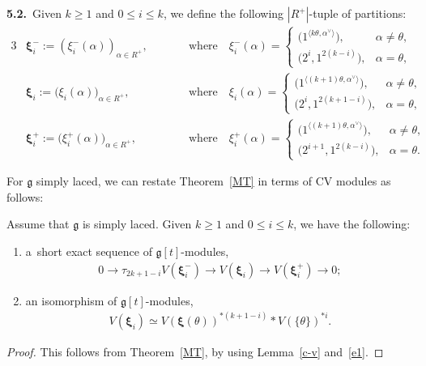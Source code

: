 \documentclass[pdftex]{sigma}
\numberwithin{equation}{section}
\begin{document}
{\bf 5.2.}~Given $k\geq 1$ and $0\leq i \leq k $, we def\/ine the following $|R^{+}|$-tuple of partitions:
\begin{alignat*}{3}
&\pmb\xi_{i}^{-}:=(\xi^{-}_{i}(\alpha))_{\alpha\in R^{+}},
\qquad&&
\text{where}
\quad
\xi^{-}_{i}(\alpha)=
\begin{cases}
\big(1^{\langle k\theta, \alpha^{\vee} \rangle}\big), & \alpha\neq \theta,
\\
\big(2^{i}, 1^{2(k-i)}\big), & \alpha=\theta,
\end{cases}&
\\
& \pmb\xi_{i}:=\big(\xi_{i}(\alpha)\big)_{\alpha\in R^{+}},
\qquad &&
\text{where}
\quad
\xi_{i}(\alpha)=
\begin{cases}
\big(1^{\langle (k+1)\theta, \alpha^{\vee} \rangle}\big), & \alpha\neq \theta,
\\
\big(2^{i}, 1^{2(k+1-i)}\big), & \alpha=\theta,
\end{cases}&
\\
& \pmb\xi_{i}^{+}:=\big(\xi^{+}_{i}(\alpha)\big)_{\alpha\in R^{+}},
\qquad &&
\text{where}
\quad
\xi^{+}_{i}(\alpha)=
\begin{cases}
\big(1^{\langle (k+1)\theta, \alpha^{\vee} \rangle}\big), & \alpha\neq \theta,
\\
\big(2^{i+1}, 1^{2(k-i)}\big), & \alpha=\theta.
\end{cases}&
\end{alignat*}

For $\mathfrak{g}$ simply laced, we can restate Theorem~\ref{MT} in terms of CV modules as follows:
\begin{theorem}
\label{T2}
Assume that $\mathfrak{g}$ is simply laced.
Given $k\geq 1$ and $0\leq i \leq k $, we have the following:
\begin{enumerate}\itemsep=0pt
\item[$1)$] a~short exact sequence of $\mathfrak{g}[t]$-modules,
\begin{gather*}
0 \rightarrow \tau_{2k+1-i}V(\pmb\xi^{-}_{i}) \rightarrow V(\pmb\xi_{i}) \rightarrow V(\pmb\xi^{+}_{i}) \rightarrow 0;
\end{gather*}
\item[$2)$] an isomorphism of $\mathfrak{g}[t]$-modules,
\begin{gather*}
V(\pmb\xi_{i}) \simeq V(\pmb\xi(\theta))^{* (k+1-i)} * V(\{\theta\})^{*i}.
\end{gather*}
\end{enumerate}
\end{theorem}
\begin{proof}
This follows from Theorem~\ref{MT}, by using Lemma~\ref{c-v} and~\eqref{e1}.
\end{proof}
\end{document}
